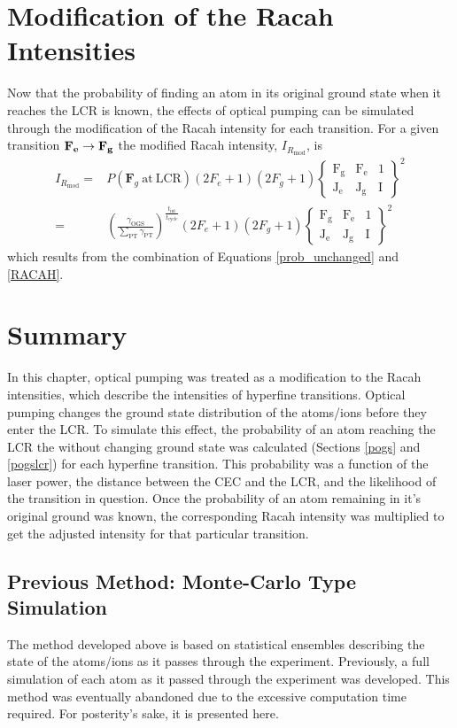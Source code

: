 \section{Modification of the Racah Intensities}
Now that the probability of finding an atom in its original ground state when it reaches the LCR is known, the effects of optical pumping can be simulated through the modification of the Racah intensity for each transition. For a given transition $\bf{F}_e \rightarrow \bf{F}_g$ the modified Racah intensity, $I_{R_{\mathrm{mod}}}$, is 
\begin{align}
I_{R_{\mathrm{mod}}} =& P(\mathbf{F}_g\ \mathrm{at\ LCR})
(2F_e+1)(2F_g+1)
\left\lbrace
\mathrm{
\begin{matrix}
F_g & F_e & 1\\
J_e & J_g & \mathrm{I} 
\end{matrix}
}
\right\rbrace^2\\
=& \left(\frac{\gamma_{\mathrm{OGS}}}{\sum_{\mathrm{PT}}\gamma_{\mathrm{PT}}}\right)^{\frac{t_{\mathrm{int}}}{t_{\mathrm{cycle}}}}
(2F_e+1)(2F_g+1)
\left\lbrace
\mathrm{
\begin{matrix}
F_g & F_e & 1\\
J_e & J_g & \mathrm{I} 
\end{matrix}
}
\right\rbrace^2
\label{final_eq}
\end{align}
which results from the combination of Equations \ref{prob_unchanged} and \ref{RACAH}.

\section{Summary}
In this chapter, optical pumping was treated as a modification to the Racah intensities, which describe the intensities of hyperfine transitions. Optical pumping changes the ground state distribution of the atoms/ions before they enter the LCR. To simulate this effect, the probability of an atom reaching the LCR the without changing ground state was calculated (Sections \ref{pogs} and \ref{pogslcr}) for each hyperfine transition. This probability was a function of the laser power, the distance between the CEC and the LCR, and the likelihood of the transition in question. Once the probability of an atom remaining in it's original ground was known, the corresponding Racah intensity was multiplied to get the adjusted intensity for that particular transition. 

\subsection{Previous Method: Monte-Carlo Type Simulation}
The method developed above is based on statistical ensembles describing the state of the atoms/ions as it passes through the experiment. Previously, a full simulation of each atom as it passed through the experiment was developed. This method was eventually abandoned due to the excessive computation time required. For posterity's sake, it is presented here.


